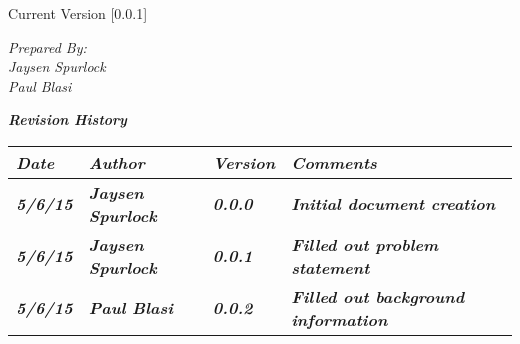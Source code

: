 
Current Version [0.0.1]
\vspace*{5mm}

{\color{MSBlue3}
\noindent
\textit{Prepared By:}\\
\textit{Jaysen Spurlock}\\
\textit{Paul Blasi}
}

\newcommand{\revision}[4]
{
    \textit{\textbf{#1}}
    & \textit{\textbf{#2}}
    & \textit{\textbf{#3}}
    & \textit{\textbf{#4}}
    \tabularnewline\hline
}

\vfill
\noindent
{\color{color02} \textit{\textbf{Revision History}}}\\
\begin{tabular}{|>{\raggedright}p{1.5cm}
                |>{\raggedright}p{3cm}
                |>{\raggedright}p{1.5cm}
                |>{\raggedright}p{9cm}
                |}
\hline

\revision{Date}{Author}{Version}{Comments}
\revision{5/6/15}{Jaysen Spurlock}{0.0.0}{Initial document creation}
\revision{5/6/15}{Jaysen Spurlock}{0.0.1}{Filled out problem statement}
\revision{5/6/15}{Paul Blasi}{0.0.2}{Filled out background information}
\end{tabular}
\vfill
